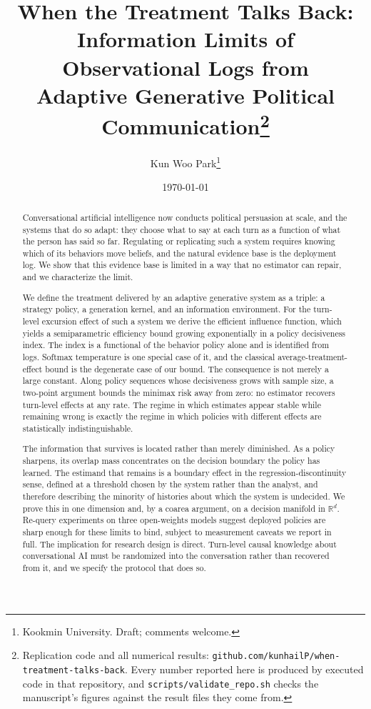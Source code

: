 \documentclass[11pt]{article}
\title{When the Treatment Talks Back:\\
Information Limits of Observational Logs from\\
Adaptive Generative Political Communication\thanks{Replication code and all
numerical results: \texttt{github.com/kunhailP/when-treatment-talks-back}.
Every number reported here is produced by executed code in that repository,
and \texttt{scripts/validate\_repo.sh} checks the manuscript's figures
against the result files they come from.}}
\author{Kun Woo Park\thanks{Kookmin University. Draft; comments welcome.}}
\date{\today}
\theoremstyle{definition}
\theoremstyle{remark}
\begin{document}
\maketitle

\begin{abstract}
\noindent Conversational artificial intelligence now conducts political
persuasion at scale, and the systems that do so adapt: they choose what to
say at each turn as a function of what the person has said so far. Regulating
or replicating such a system requires knowing which of its behaviors move
beliefs, and the natural evidence base is the deployment log. We show that
this evidence base is limited in a way that no estimator can repair, and we
characterize the limit.

We define the treatment delivered by an adaptive generative system as a
triple: a strategy policy, a generation kernel, and an information
environment. For the turn-level excursion effect of such a system we derive
the efficient influence function, which yields a semiparametric efficiency
bound growing exponentially in a policy decisiveness index. The index is a
functional of the behavior policy alone and is identified from logs. Softmax
temperature is one special case of it, and the classical
average-treatment-effect bound is the degenerate case of our bound. The
consequence is not merely a large constant. Along policy sequences whose
decisiveness grows with sample size, a two-point argument bounds the minimax
risk away from zero: no estimator recovers turn-level effects at any rate.
The regime in which estimates appear stable while remaining wrong is exactly
the regime in which policies with different effects are statistically
indistinguishable.

The information that survives is located rather than merely diminished. As a
policy sharpens, its overlap mass concentrates on the decision boundary the
policy has learned. The estimand that remains is a boundary effect in the
regression-discontinuity sense, defined at a threshold chosen by the system
rather than the analyst, and therefore describing the minority of histories
about which the system is undecided. We prove this in one dimension and, by a
coarea argument, on a decision manifold in $\mathbb{R}^d$. Re-query
experiments on three open-weights models suggest deployed policies are sharp
enough for these limits to bind, subject to measurement caveats we report in
full. The implication for research design is direct. Turn-level causal
knowledge about conversational AI must be randomized into the conversation
rather than recovered from it, and we specify the protocol that does so.
\end{abstract}
\end{document}
